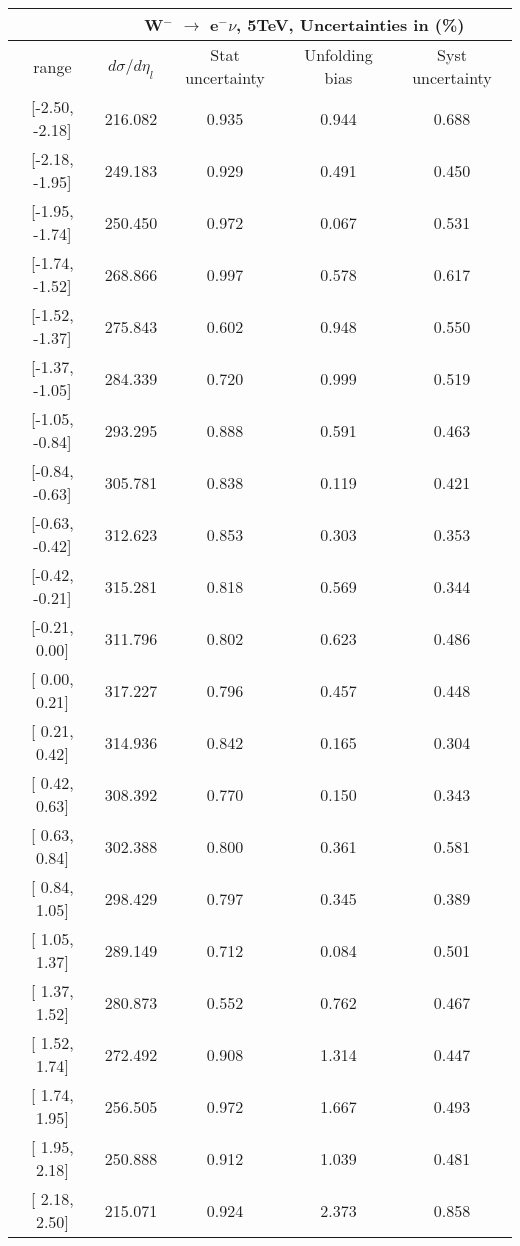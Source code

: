 \documentclass[12pt]{article}
\begin{document}
 
\begin{table}[] 
\begin{tabular}{c|c|c|c|c|}
\cline{2-5}
& \multicolumn{4}{c|}{W$^{-}$ $\rightarrow$ e$^{-} \nu $, 5TeV, Uncertainties in (\%)}  \\ \hline \hline 
\multicolumn{1}{|c|}{  range } & $d\sigma$/$d\eta_{l}$   & Stat uncertainty     & Unfolding bias     & Syst uncertainty        \\ \hline \hline 
\multicolumn{1}{|c|}{{[}-2.50,  -2.18{]}}  & 216.082 & 0.935 & 0.944 & 0.688 \\ \hline 
\multicolumn{1}{|c|}{{[}-2.18,  -1.95{]}}  & 249.183 & 0.929 & 0.491 & 0.450 \\ \hline 
\multicolumn{1}{|c|}{{[}-1.95,  -1.74{]}}  & 250.450 & 0.972 & 0.067 & 0.531 \\ \hline 
\multicolumn{1}{|c|}{{[}-1.74,  -1.52{]}}  & 268.866 & 0.997 & 0.578 & 0.617 \\ \hline 
\multicolumn{1}{|c|}{{[}-1.52,  -1.37{]}}  & 275.843 & 0.602 & 0.948 & 0.550 \\ \hline 
\multicolumn{1}{|c|}{{[}-1.37,  -1.05{]}}  & 284.339 & 0.720 & 0.999 & 0.519 \\ \hline 
\multicolumn{1}{|c|}{{[}-1.05,  -0.84{]}}  & 293.295 & 0.888 & 0.591 & 0.463 \\ \hline 
\multicolumn{1}{|c|}{{[}-0.84,  -0.63{]}}  & 305.781 & 0.838 & 0.119 & 0.421 \\ \hline 
\multicolumn{1}{|c|}{{[}-0.63,  -0.42{]}}  & 312.623 & 0.853 & 0.303 & 0.353 \\ \hline 
\multicolumn{1}{|c|}{{[}-0.42,  -0.21{]}}  & 315.281 & 0.818 & 0.569 & 0.344 \\ \hline 
\multicolumn{1}{|c|}{{[}-0.21,   0.00{]}}  & 311.796 & 0.802 & 0.623 & 0.486 \\ \hline 
\multicolumn{1}{|c|}{{[} 0.00,   0.21{]}}  & 317.227 & 0.796 & 0.457 & 0.448 \\ \hline 
\multicolumn{1}{|c|}{{[} 0.21,   0.42{]}}  & 314.936 & 0.842 & 0.165 & 0.304 \\ \hline 
\multicolumn{1}{|c|}{{[} 0.42,   0.63{]}}  & 308.392 & 0.770 & 0.150 & 0.343 \\ \hline 
\multicolumn{1}{|c|}{{[} 0.63,   0.84{]}}  & 302.388 & 0.800 & 0.361 & 0.581 \\ \hline 
\multicolumn{1}{|c|}{{[} 0.84,   1.05{]}}  & 298.429 & 0.797 & 0.345 & 0.389 \\ \hline 
\multicolumn{1}{|c|}{{[} 1.05,   1.37{]}}  & 289.149 & 0.712 & 0.084 & 0.501 \\ \hline 
\multicolumn{1}{|c|}{{[} 1.37,   1.52{]}}  & 280.873 & 0.552 & 0.762 & 0.467 \\ \hline 
\multicolumn{1}{|c|}{{[} 1.52,   1.74{]}}  & 272.492 & 0.908 & 1.314 & 0.447 \\ \hline 
\multicolumn{1}{|c|}{{[} 1.74,   1.95{]}}  & 256.505 & 0.972 & 1.667 & 0.493 \\ \hline 
\multicolumn{1}{|c|}{{[} 1.95,   2.18{]}}  & 250.888 & 0.912 & 1.039 & 0.481 \\ \hline 
\multicolumn{1}{|c|}{{[} 2.18,   2.50{]}}  & 215.071 & 0.924 & 2.373 & 0.858 \\ \hline 
\end{tabular}
\end{table}
\end{document}
